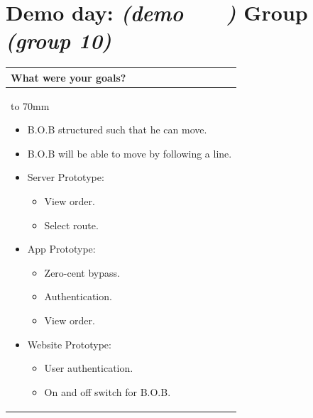 \documentclass[a4paper]{article}
\newcommand{\colWidth}{141mm}
\begin{document}
 
\section*{Demo day: \textit{(demo   \  \  \  )} Group \textit{(group 10)}}


\begin{center}
\begin{tabular}{|p{\colWidth}|}
	\hline
	\cellcolor{blue!25}\large
	\textbf{What were your goals?}
	\\ \hline
	\vtop to 70mm{
\begin{itemize}
    \item B.O.B structured such that he can move.
    \item B.O.B will be able to move by following a line.
    \item Server Prototype: 
    \begin{itemize}
        \item View order.
        \item Select route.
    \end{itemize}
    \item App Prototype:
    \begin{itemize}
        \item Zero-cent bypass.
        \item Authentication.
        \item View order.
    \end{itemize}
    \item Website Prototype: 
    \begin{itemize}
        \item User authentication.
        \item On and off switch for B.O.B.
    \end{itemize}
\end{itemize}
  }
  \\
  \hline
\end{tabular}
\vskip 5mm



\end{center}
\end{document}
